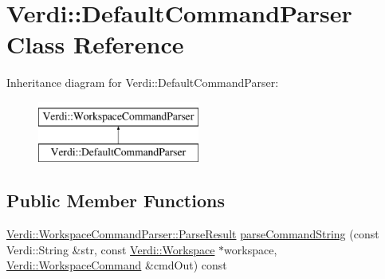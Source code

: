 \hypertarget{class_verdi_1_1_default_command_parser}{\section{\-Verdi\-:\-:\-Default\-Command\-Parser \-Class \-Reference}
\label{class_verdi_1_1_default_command_parser}
}
\-Inheritance diagram for \-Verdi\-:\-:\-Default\-Command\-Parser\-:\begin{figure}[H]
\begin{center}
\leavevmode
\includegraphics[height=2.000000cm]{class_verdi_1_1_default_command_parser}
\end{center}
\end{figure}
\subsection*{\-Public \-Member \-Functions}
\begin{DoxyCompactItemize}
\item 
\hyperlink{class_verdi_1_1_workspace_command_parser_1_1_parse_result}{\-Verdi\-::\-Workspace\-Command\-Parser\-::\-Parse\-Result} \hyperlink{class_verdi_1_1_default_command_parser_ac1f263fdf52293de8d90813c7737bb07}{parse\-Command\-String} (const \-Verdi\-::\-String \&str, const \hyperlink{class_verdi_1_1_workspace}{\-Verdi\-::\-Workspace} $\ast$workspace, \hyperlink{class_verdi_1_1_workspace_command}{\-Verdi\-::\-Workspace\-Command} \&cmd\-Out) const 
\end{DoxyCompactItemize}


